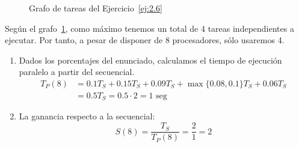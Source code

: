 \begin{ejercicio}
\begin{figure}
        \caption{Grafo de tareas del Ejercicio~\ref{ej:2.6}}
        \label{fig:Grafo_2.6}
    \end{figure}

    Según el grafo~\ref{fig:Grafo_2.6}, como máximo tenemos un total de 4 tareas independientes a ejecutar. Por tanto, a pesar de disponer de 8 procesadores, sólo usaremos 4.

    \begin{enumerate}
        \item Dados los porcentajes del enunciado, calculamos el tiempo de ejecución paralelo a partir del secuencial.
            \begin{align*}
                T_P(8) &= 0.1T_S + 0.15T_S + 0.09T_S + \max\{0.08, 0.1\}T_S + 0.06T_S \\
                       &= 0.5T_S = 0.5\cdot 2 = 1\text{\ seg}
            \end{align*}
        \item La ganancia respecto a la secuencial:
            \begin{equation*}
                S(8) = \dfrac{T_S}{T_P(8)} = \dfrac{2}{1} = 2
            \end{equation*}
    \end{enumerate}

\end{ejercicio}

